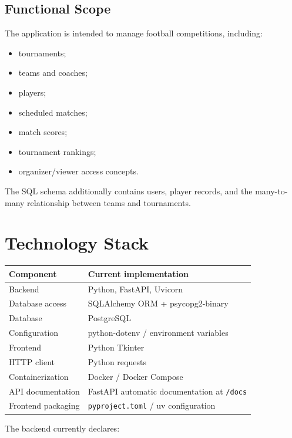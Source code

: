 \documentclass[11pt,a4paper]{article}
\begin{document}
\subsection{Functional Scope}

The application is intended to manage football competitions,
including:

\begin{itemize}
    \item tournaments;
    \item teams and coaches;
    \item players;
    \item scheduled matches;
    \item match scores;
    \item tournament rankings;
    \item organizer/viewer access concepts.
\end{itemize}

The SQL schema additionally contains users, player records, and the
many-to-many relationship between teams and tournaments.

\section{Technology Stack}

\begin{longtable}{p{}p{}}
\toprule
\textbf{Component} & \textbf{Current implementation} \\
\midrule
Backend & Python, FastAPI, Uvicorn \\
Database access & SQLAlchemy ORM + psycopg2-binary \\
Database & PostgreSQL \\
Configuration & python-dotenv / environment variables \\
Frontend & Python Tkinter \\
HTTP client & Python requests \\
Containerization & Docker / Docker Compose \\
API documentation & FastAPI automatic documentation at \texttt{/docs} \\
Frontend packaging & \texttt{pyproject.toml} / uv configuration \\
\bottomrule
\end{longtable}

The backend currently declares:
\end{document}
